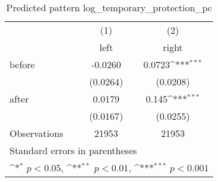 \begin{table}[htbp]\centering
\def\sym#1{\ifmmode^{#1}\else\(^{#1}\)\fi}
\caption{Predicted pattern log\_temporary\_protection\_pc}
\begin{tabular}{l*{2}{c}}
\hline\hline
                    &\multicolumn{1}{c}{(1)}&\multicolumn{1}{c}{(2)}\\
                    &\multicolumn{1}{c}{left}&\multicolumn{1}{c}{right}\\
\hline
before              &     -0.0260         &      0.0723\sym{***}\\
                    &    (0.0264)         &    (0.0208)         \\
[1em]
after               &      0.0179         &       0.145\sym{***}\\
                    &    (0.0167)         &    (0.0255)         \\
\hline
Observations        &       21953         &       21953         \\
\hline\hline
\multicolumn{3}{l}{\footnotesize Standard errors in parentheses}\\
\multicolumn{3}{l}{\footnotesize \sym{*} \(p<0.05\), \sym{**} \(p<0.01\), \sym{***} \(p<0.001\)}\\
\end{tabular}
\end{table}
